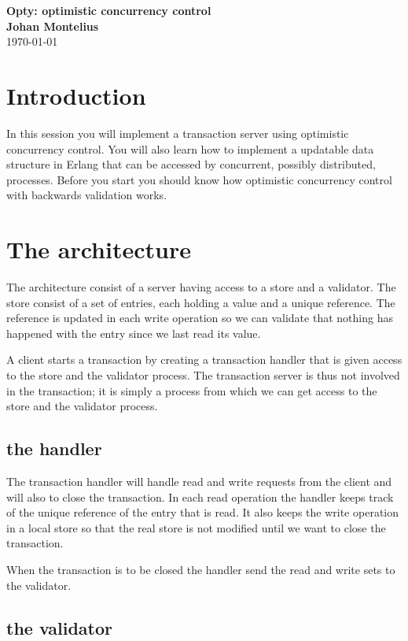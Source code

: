 \documentclass[a4paper, 11pt]{article}
\newcommand{\nnsection}[1]{
\section*{#1}
\addcontentsline{toc}{section}{#1}
}
\begin{document}
\begin{center}
\vspace{20pt}
\textbf{\large Opty: optimistic concurrency control}\\
\vspace{10pt}
\textbf{Johan Montelius}\\
\vspace{10pt}
\today{}
\end{center}

\nnsection{Introduction}

In this session you will implement a transaction server using
optimistic concurrency control. You will also learn how to implement a
updatable data structure in Erlang that can be accessed by concurrent,
possibly distributed, processes. Before you start you should know how
optimistic concurrency control with backwards validation works.

\section{The architecture}

The architecture consist of a server having access to a store and a
validator. The store consist of a set of entries, each holding a value
and a unique reference. The reference is updated in each write
operation so we can validate that nothing has happened with the entry
since we last read its value.

A client starts a transaction by creating a transaction handler that
is given access to the store and the validator process. The
transaction server is thus not involved in the transaction; it
is simply a process from which we can get access to the store and the
validator process.

\subsection{the handler}

The transaction handler will handle read and write requests from the
client and will also to close the transaction. In each read operation
the handler keeps track of the unique reference of the entry that is
read. It also keeps the write operation in a local store so that the
real store is not modified until we want to close the transaction. 

When the transaction is to be closed the handler send the read and
write sets to the validator.

\subsection{the validator}
\end{document}
